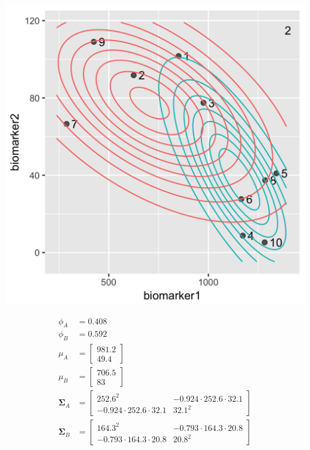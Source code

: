 \begin{enumerate}
\begin{minipage}[t]{0.45\textwidth}
\begin{center}
\includegraphics[scale=0.15]{img/biomarker-data-labels-2.png}
\end{center}
\end{minipage}
\qquad
\begin{minipage}[t]{0.45\textwidth}
\small
\begin{align*} 
\phi_A &= 0.408 \\
\phi_B &= 0.592 \\
\mu_A &= \begin{bmatrix} 981.2 \\ 49.4 \end{bmatrix} \\
\mu_B &= \begin{bmatrix} 706.5 \\ 83 \end{bmatrix} \\
\boldsymbol\Sigma_A &= \begin{bmatrix} 252.6^2 & -0.924 \cdot 252.6 \cdot 32.1 \\ -0.924 \cdot 252.6 \cdot 32.1 & 32.1^2 \end{bmatrix} \\
\boldsymbol\Sigma_B &= \begin{bmatrix} 164.3^2 & -0.793 \cdot 164.3 \cdot 20.8 \\ -0.793 \cdot 164.3 \cdot 20.8 & 20.8^2 \end{bmatrix} 
\end{align*}
\end{minipage}


\end{enumerate}
